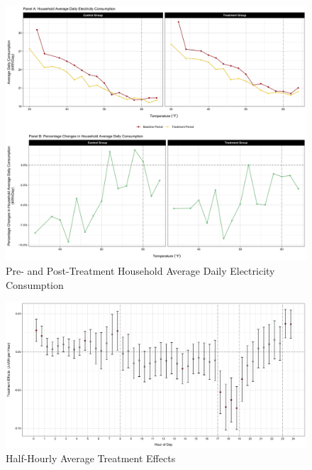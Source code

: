     \begin{figure}[t!]
        \centering
        \includegraphics[scale = 0.032]{03_Chapter-2/00A_Figures/Figure_For-Motivation_Daily-Consumption-with-Percentage-Changes_Base-only-the-Second-Half_Step-Size-2.png}
        \caption{Pre- and Post-Treatment Household Average Daily Electricity Consumption}
        \label{Figure:Pre-and-Post-Treatment-Household-Average-Daily-Electricity-Consumption}
    \end{figure}
\vspace{0.3cm}

    \begin{figure}
        \centering
        \includegraphics[scale = 0.10]{03_Chapter-2/00A_Figures/Figure_Time-Profile-of-Half-Hourly-ATEs.png}
        \caption{Half-Hourly Average Treatment Effects}
        \label{Figure:Half-Hourly-Average-Treatment-Effects}
    \end{figure}
\hspace{0.3cm}

